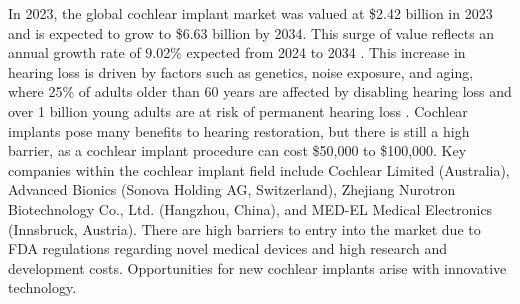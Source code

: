 In 2023, the global cochlear implant market was valued at \$2.42 billion in 2023 and is expected to grow to \$6.63 billion by 2034. This surge of value reflects an annual growth rate of 9.02\% expected from 2024 to 2034 \cite{globenewswire2025cochlear}. This increase in hearing loss is driven by factors such as genetics, noise exposure, and aging, where 25\% of adults older than 60 years are affected by disabling hearing loss and over 1 billion young adults are at risk of permanent hearing loss \cite{WHO2025}. Cochlear implants pose many benefits to hearing restoration, but there is still a high barrier, as a cochlear implant procedure can cost \$50,000 to \$100,000. Key companies within the cochlear implant field include Cochlear Limited (Australia), Advanced Bionics (Sonova Holding AG, Switzerland), Zhejiang Nurotron Biotechnology Co., Ltd. (Hangzhou, China), and MED-EL Medical Electronics (Innsbruck, Austria).  There are high barriers to entry into the market due to FDA regulations regarding novel medical devices and high research and development costs. Opportunities for new cochlear implants arise with innovative technology.
